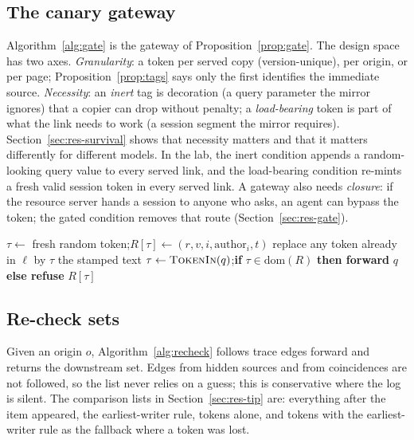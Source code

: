 \subsection{The canary gateway}\label{sec:gateway}
Algorithm~\ref{alg:gate} is the gateway of Proposition~\ref{prop:gate}. The design space has two axes. \emph{Granularity}: a token per served copy (version-unique), per origin, or per page; Proposition~\ref{prop:tags} says only the first identifies the immediate source. \emph{Necessity}: an \emph{inert} tag is decoration (a query parameter the mirror ignores) that a copier can drop without penalty; a \emph{load-bearing} token is part of what the link needs to work (a session segment the mirror requires). Section~\ref{sec:res-survival} shows that necessity matters and that it matters differently for different models. In the lab, the inert condition appends a random-looking query value to every served link, and the load-bearing condition re-mints a fresh valid session token in every served link. A gateway also needs \emph{closure}: if the resource server hands a session to anyone who asks, an agent can bypass the token; the gated condition removes that route (Section~\ref{sec:res-gate}).

\begin{algorithm}[t]
\caption{Canary gateway}\label{alg:gate}
\begin{algorithmic}[1]
    \State $\tau\gets$ fresh random token;\quad $R[\tau]\gets(r,v,i,\mathrm{author}_i,t)$
    \State replace any token already in $\ell$ by $\tau$ 
  \EndFor
  \State \Return the stamped text
\EndProcedure
{}
  \State $\tau\gets\textsc{TokenIn}(q)$;\quad \textbf{if} $\tau\in\mathrm{dom}(R)$ \textbf{then forward} $q$ \textbf{else refuse}
\EndProcedure
{} \State \Return $R[\tau]$ \EndProcedure
\end{algorithmic}
\end{algorithm}

\subsection{Re-check sets}\label{sec:recheck}
Given an origin $o$, Algorithm~\ref{alg:recheck} follows trace edges forward and returns the downstream set. Edges from hidden sources and from coincidences are not followed, so the list never relies on a guess; this is conservative where the log is silent. The comparison lists in Section~\ref{sec:res-tip} are: everything after the item appeared, the earliest-writer rule, tokens alone, and tokens with the earliest-writer rule as the fallback where a token was lost.

